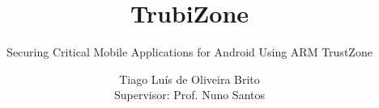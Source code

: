\documentclass{./llncs2e/llncs}
\begin{document}
\title{TrubiZone}

\subtitle{Securing Critical Mobile Applications for Android Using ARM TrustZone}
\author{Tiago Luís de Oliveira Brito\\
Supervisor: Prof. Nuno Santos}


\maketitle

\setcounter{secnumdepth}{3}
\setcounter{tocdepth}{3}
\makeatletter
\renewcommand*\l@author[2]{}
\renewcommand*\l@title[2]{}
\makeatletter
\renewcommand\subsubsection{\@startsection{subsubsection}{2}{\z@}%
	{-18\p@ \@plus -4\p@ \@minus -4\p@}%
	{8\p@ \@plus 4\p@ \@minus 4\p@}%
	{\normalfont\normalsize\bfseries\boldmath
		\rightskip=\z@ \@plus 8em\pretolerance=10000 }}


%

\pagestyle{plain}

%





%

%
%



%
\end{document}
